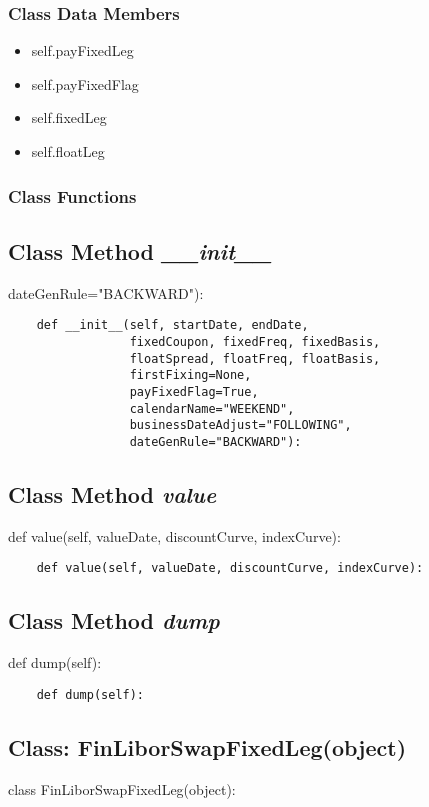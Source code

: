 \documentclass[twoside,11pt]{book}
\begin{document}
\subsubsection{Class Data Members}
\begin{itemize}
\item{self.payFixedLeg}
\item{self.payFixedFlag}
\item{self.fixedLeg}
\item{self.floatLeg}
\end{itemize}

\subsubsection{Class Functions}

\subsection{Class Method {\it \_\_init\_\_}}
dateGenRule="BACKWARD"):

\begin{lstlisting}
    def __init__(self, startDate, endDate,
                 fixedCoupon, fixedFreq, fixedBasis,
                 floatSpread, floatFreq, floatBasis,
                 firstFixing=None,
                 payFixedFlag=True,
                 calendarName="WEEKEND",
                 businessDateAdjust="FOLLOWING",
                 dateGenRule="BACKWARD"):
\end{lstlisting}

\subsection{Class Method {\it value}}
def value(self, valueDate, discountCurve, indexCurve):

\begin{lstlisting}
    def value(self, valueDate, discountCurve, indexCurve):
\end{lstlisting}

\subsection{Class Method {\it dump}}
def dump(self):

\begin{lstlisting}
    def dump(self):
\end{lstlisting}

\subsection{Class: FinLiborSwapFixedLeg(object)}
class FinLiborSwapFixedLeg(object):
\end{document}
